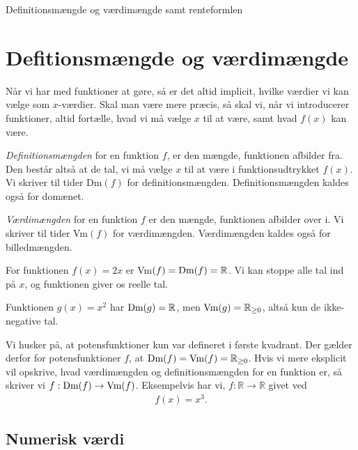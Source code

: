 \begin{center}
\Huge
Definitionsmængde og værdimængde samt renteformlen
\end{center}
\section*{Defitionsmængde og værdimængde}

Når vi har med funktioner at gøre, så er det altid implicit, hvilke værdier vi kan vælge som $x$-værdier. Skal man være mere præcis, så skal vi, når vi introducerer funktioner, altid fortælle, hvad vi må vælge $x$ til at være, samt hvad $f(x)$ kan være. 
\begin{defn}[Definitionsmængde]
\textit{Definitionsmængden} for en funktion $f$, er den mængde, funktionen afbilder fra. Den består altså at de tal, vi må vælge $x$ til at være i funktionsudtrykket $f(x)$. Vi skriver til tider Dm$(f)$ for definitionsmængden. Definitionsmængden kaldes også for domænet.
\end{defn}
\begin{defn}[Værdimængde]
\textit{Værdimængden} for en funktion $f$ er den mængde, funktionen afbilder over i. Vi skriver til tider Vm$(f)$ for værdimængden. Værdimængden kaldes også for billedmængden.
\end{defn}
\begin{exa}
For funktionen $f(x) = 2x$ er Vm$(f) = \textnormal{Dm}(f) = \mathbb{R}$. Vi kan stoppe alle tal ind på $x$, og funktionen giver os reelle tal.  
\end{exa}
\begin{exa}
Funktionen $g(x) = x^2$ har $\textnormal{Dm}(g) = \mathbb{R}$, men $\textnormal{Vm}(g) = \mathbb{R}_{\geq 0}$, altså kun de ikke-negative tal.
\end{exa}
Vi husker på, at potensfunktioner kun var defineret i første kvadrant. Der gælder derfor for potensfunktioner $f$, at $\textnormal{Dm}(f) = \textnormal{Vm}(f) = \mathbb{R}_{\geq 0}$. Hvis vi mere eksplicit vil opskrive, hvad værdimængden og definitionsmængden for en funktion er, så skriver vi $f: \textnormal{Dm}(f) \to \textnormal{Vm}(f)$. Eksempelvis har vi, $f:\mathbb{R} \to \mathbb{R}$ givet ved 
\begin{align*}
f(x) = x^3.
\end{align*}

\subsection{Numerisk værdi}

